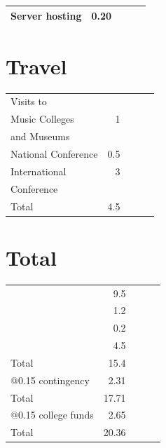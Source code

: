 \documentclass{tufte-handout}
\begin{document}
\begin{center}
\begin{tabular}{lrlll}
\hline
 Server hosting  &  0.20  &     &     &     \\
\hline
\end{tabular}
\end{center}
\section{Travel}
\label{sec-1-4}



\begin{center}
\begin{tabular}{lrlll}
\hline
 Visits to            &       &     &     &     \\
 Music Colleges       &    1  &     &     &     \\
 and Museums          &       &     &     &     \\
\hline
 National Conference  &  0.5  &     &     &     \\
\hline
 International        &    3  &     &     &     \\
 Conference           &       &     &     &     \\
\hline
 Total                &  4.5  &     &     &     \\
\hline
\end{tabular}
\end{center}
\section{Total}
\label{sec-1-5}



\begin{center}
\begin{tabular}{lrlll}
\hline
                    &    9.5  &     &     &     \\

                    &    1.2  &     &     &     \\

                    &    0.2  &     &     &     \\

                    &    4.5  &     &     &     \\
\hline
 Total              &   15.4  &     &     &     \\
\hline
 @0.15 contingency  &   2.31  &     &     &     \\
\hline
 Total              &  17.71  &     &     &     \\
\hline
 @0.15 college funds & 2.65 &  &  & \\
\hline
Total 			   & 20.36 & & & \\
\hline
\end{tabular}
\end{center}
\end{document}
